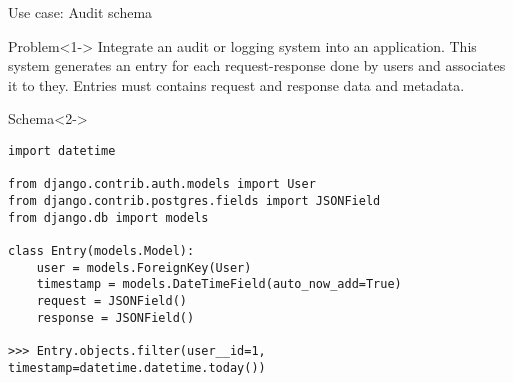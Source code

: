\begin{frame}[fragile]{Use case: Audit schema}
    \begin{block}{Problem}<1->
        Integrate an audit or logging system into an application. This system generates an entry for each request-response done by users and associates it to they. Entries must contains request and response data and metadata.
    \end{block}

    \begin{block}{Schema}<2->
        \begin{verbatim}
import datetime

from django.contrib.auth.models import User
from django.contrib.postgres.fields import JSONField
from django.db import models

class Entry(models.Model):
    user = models.ForeignKey(User)
    timestamp = models.DateTimeField(auto_now_add=True)
    request = JSONField()
    response = JSONField()

>>> Entry.objects.filter(user__id=1, timestamp=datetime.datetime.today())
        \end{verbatim}
    \end{block}
\end{frame}
